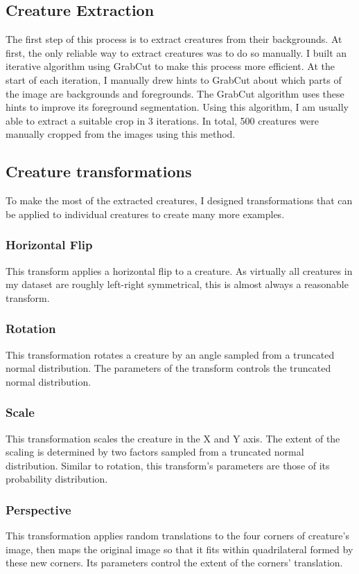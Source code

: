 \documentclass[12pt,a4paper,twoside,openright]{report}
\begin{document}
\subsection{Creature Extraction}
The first step of this process is to extract creatures from their backgrounds. 
At first, the only reliable way to extract creatures was to do so manually. I built an iterative algorithm using GrabCut \cite{rother_grabcut_nodate} to make this process more efficient. At the start of each iteration, I manually drew hints to GrabCut about which parts of the image are backgrounds and foregrounds. The GrabCut algorithm uses these hints to improve its foreground segmentation. Using this algorithm, I am usually able to extract a suitable crop in 3 iterations. In total, 500 creatures were manually cropped from the images using this method.

\subsection{Creature transformations}
To make the most of the extracted creatures, I designed transformations that can be applied to individual creatures to create many more examples.

\subsubsection{Horizontal Flip}
This transform applies a horizontal flip to a creature. As virtually all creatures in my dataset are roughly left-right symmetrical, this is almost always a reasonable transform.

\subsubsection{Rotation}
This transformation rotates a creature by an angle sampled from a truncated normal distribution. The parameters of the transform controls the truncated normal distribution.

\subsubsection{Scale}
This transformation scales the creature in the X and Y axis. The extent of the scaling is determined by two factors sampled from a truncated normal distribution. Similar to rotation, this transform's parameters are those of its probability distribution.

\subsubsection{Perspective}
This transformation applies random translations to the four corners of creature's image, then maps the original image so that it fits within quadrilateral formed by these new corners. Its parameters control the extent of the corners' translation.
\end{document}
